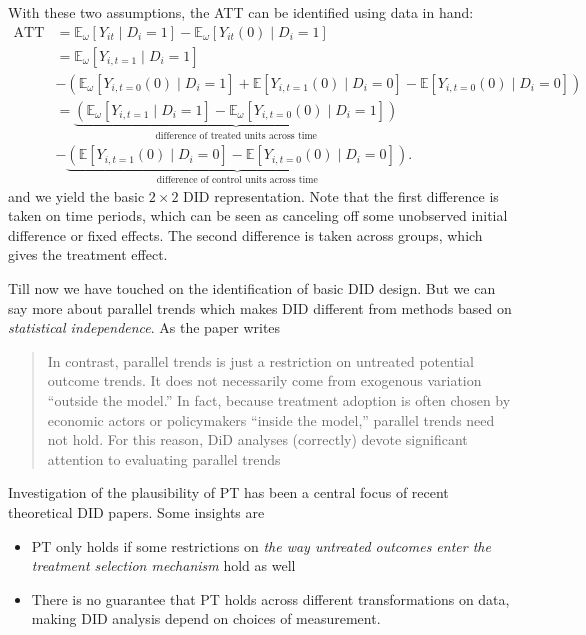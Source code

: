 \documentclass[12pt]{article}
\begin{document}
With these two assumptions, the ATT can be identified using data in hand:
\begin{align}
  \text{ATT} &= \mathbb{E}_{\omega}[Y_{it} \mid D_i=1] - \mathbb{E}_{\omega}[Y_{it}(0)
  \mid D_{i}=1] \nonumber \\
  &= \mathbb{E}_{\omega }[Y_{i,t=1} \mid D_{i}=1] \nonumber \\
  &- \left(\mathbb{E}_{\omega }[Y_{i,t=0}(0)
    \mid D_{i}=1] + \mathbb{E}[Y_{i,t=1}(0) \mid D_i=0] - \mathbb{E}[Y_{i,t=0}(0) \mid
  D_i=0] \right)\label{eq:att_did} \\
  &= \underbrace{\left(\mathbb{E}_{\omega }[Y_{i,t=1} \mid D_{i}=1] - \mathbb{E}_{\omega
  }[Y_{i,t=0}(0)\mid D_{i}=1]\right)}_{\text{difference of treated units across time}} \nonumber \\
  &- \underbrace{\left(\mathbb{E}[Y_{i,t=1}(0) \mid D_i=0] - \mathbb{E}[Y_{i,t=0}(0) \mid
  D_i=0] \right)}_{\text{difference of control units across time}} \nonumber
  .
\end{align}
and we yield the basic \( 2 \times 2 \) DID representation. Note that the first difference is taken
on time periods, which can be seen as canceling off some unobserved initial difference or
fixed effects.
The second difference is taken across groups, which gives the treatment effect.

Till now we have touched on the identification of basic DID design. But we can say more
about parallel trends
which makes DID different from methods based on \textit{statistical independence}. As the
paper writes
\begin{quote}
  In contrast, parallel trends is just a restriction on untreated potential outcome trends. It does
  not necessarily come from exogenous variation “outside the model.” In fact, because treatment
  adoption is often chosen by economic actors or policymakers “inside the model,” parallel trends
  need not hold. For this reason, DiD analyses (correctly) devote significant attention
  to evaluating parallel trends
\end{quote}
Investigation of the plausibility of PT has been a central focus of recent theoretical DID papers.
Some insights are
\begin{itemize}
  \item PT only holds if some restrictions on \textit{the way untreated outcomes
    enter the treatment selection mechanism} hold as well
  \item There is no guarantee that PT holds across different transformations on data, making
    DID analysis depend on choices of measurement.
\end{itemize}
\end{document}
